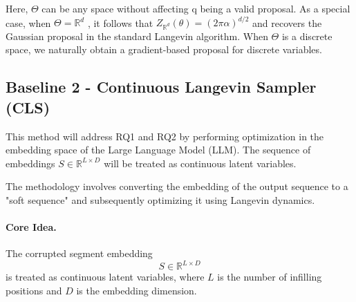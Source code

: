 \documentclass[11pt]{article}
\begin{document}
 




Here, \(\Theta\) can be any space without affecting q being a valid
proposal. As a special case, when \(\Theta = \mathbb{R}^d \) , it follows that
\( Z_{\mathbb{R}^d}(\theta) = (2\pi\alpha)^{d/2}\)
and recovers the Gaussian proposal
in the standard Langevin algorithm. When \(\Theta\) is a discrete
space, we naturally obtain a gradient-based proposal for
discrete variables.




\subsection{Baseline 2  - Continuous Langevin Sampler (CLS)}

This method will address RQ1 and RQ2 by performing optimization in the embedding space of the Large Language Model (LLM). The sequence of embeddings $S \in \mathbb{R}^{L \times D}$ will be treated as continuous latent variables.

The methodology involves converting the embedding of the output sequence to a "soft sequence" and subsequently optimizing it using Langevin dynamics.

\paragraph{Core Idea.}
The corrupted segment embedding 
\[
S \in \mathbb{R}^{L \times D}
\]
is treated as continuous latent variables, where $L$ is the number of infilling positions and $D$ is the embedding dimension.
\end{document}
